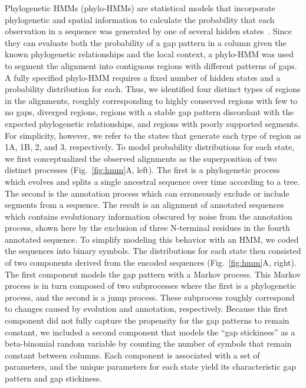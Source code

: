 Phylogenetic HMMs (phylo-HMMs) are statistical models that incorporate phylogenetic and spatial information to calculate the probability that each observation in a sequence was generated by one of several hidden states~\cite{Felsenstein1996, Siepel2004}. Since they can evaluate both the probability of a gap pattern in a column given the known phylogenetic relationships and the local context, a phylo-HMM was used to segment the alignment into contiguous regions with different patterns of gaps. A fully specified phylo-HMM requires a fixed number of hidden states and a probability distribution for each. Thus, we identified four distinct types of regions in the alignments, roughly corresponding to highly conserved regions with few to no gaps, diverged regions, regions with a stable gap pattern discordant with the expected phylogenetic relationships, and regions with poorly supported segments. For simplicity, however, we refer to the states that generate each type of region as 1A, 1B, 2, and 3, respectively. To model probability distributions for each state, we first conceptualized the observed alignments as the superposition of two distinct processes (Fig.~\ref{fig:hmm}A, left). The first is a phylogenetic process which evolves and splits a single ancestral sequence over time according to a tree. The second is the annotation process which can erroneously exclude or include segments from a sequence. The result is an alignment of annotated sequences which contains evolutionary information obscured by noise from the annotation process, shown here by the exclusion of three N-terminal residues in the fourth annotated sequence. To simplify modeling this behavior with an HMM, we coded the sequences into binary symbols. The distributions for each state then consisted of two components derived from the encoded sequences (Fig.~\ref{fig:hmm}A, right). The first component models the gap pattern with a Markov process. This Markov process is in turn composed of two subprocesses where the first is a phylogenetic process, and the second is a jump process. These subprocess roughly correspond to changes caused by evolution and annotation, respectively. Because this first component did not fully capture the propensity for the gap patterns to remain constant, we included a second component that models the ``gap stickiness'' as a beta-binomial random variable by counting the number of symbols that remain constant between columns. Each component is associated with a set of parameters, and the unique parameters for each state yield its characteristic gap pattern and gap stickiness.

